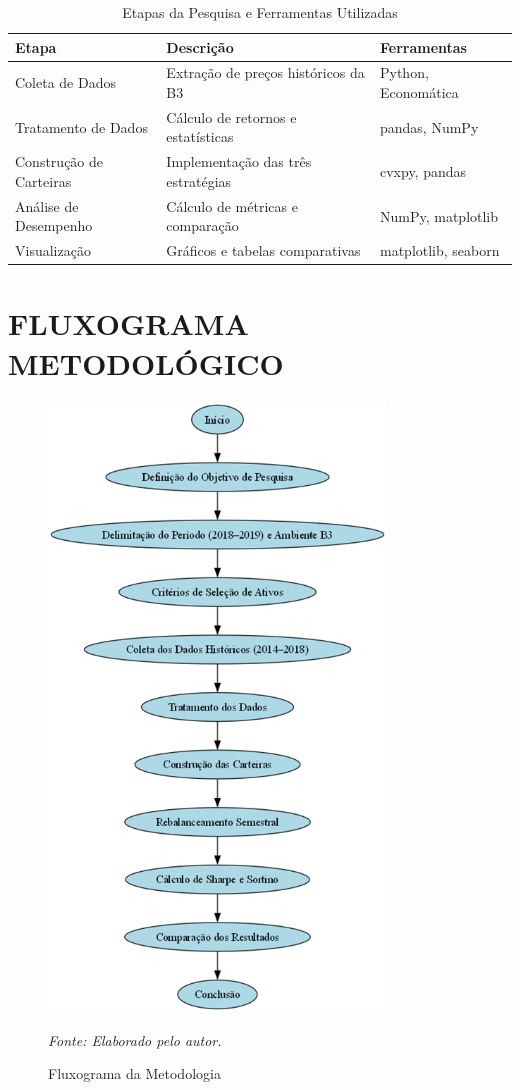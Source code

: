 \begin{table}[h]
\centering
\caption{Etapas da Pesquisa e Ferramentas Utilizadas}
\begin{tabular}{|p{4cm}|p{4cm}|p{4cm}|}
\hline
\textbf{Etapa} & \textbf{Descrição} & \textbf{Ferramentas} \\
\hline
Coleta de Dados & Extração de preços históricos da B3 & Python, Economática \\
\hline
Tratamento de Dados & Cálculo de retornos e estatísticas & pandas, NumPy \\
\hline
Construção de Carteiras & Implementação das três estratégias & cvxpy, pandas \\
\hline
Análise de Desempenho & Cálculo de métricas e comparação & NumPy, matplotlib \\
\hline
Visualização & Gráficos e tabelas comparativas & matplotlib, seaborn \\
\hline
\end{tabular}
\label{tab:etapas_pesquisa}
\end{table}

\section{FLUXOGRAMA METODOLÓGICO}

\begin{figure}[H]
\centering
\includegraphics[width=0.8\textwidth]{image.png}
\caption{Fluxograma da Metodologia}
\textit{Fonte: Elaborado pelo autor.}
\label{fig:fluxograma_metodologia}
\end{figure}


